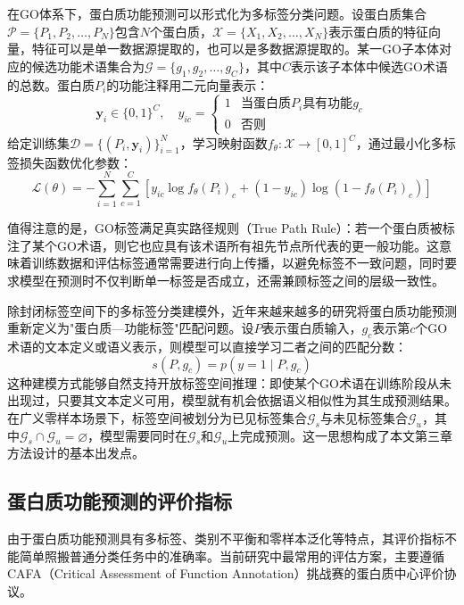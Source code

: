 在GO体系下，蛋白质功能预测可以形式化为多标签分类问题。设蛋白质集合$\mathcal{P}=\{P_1,P_2,\ldots,P_N\}$包含$N$个蛋白质，$\mathcal{X} = \{X_1, X_2, \ldots, X_N\}$表示蛋白质的特征向量，特征可以是单一数据源提取的，也可以是多数据源提取的。某一GO子本体对应的候选功能术语集合为$\mathcal{G} = \{g_1, g_2, \ldots, g_C\}$，其中$C$表示该子本体中候选GO术语的总数。蛋白质$P_i$的功能注释用二元向量表示：
\begin{equation}
\mathbf{y}_i \in \{0,1\}^C, \quad y_{ic} =
\begin{cases}
1 & \text{当蛋白质}P_i\text{具有功能}g_c \\
0 & \text{否则}
\end{cases}
\end{equation}
给定训练集$\mathcal{D} = \{(P_i, \mathbf{y}_i)\}_{i=1}^{N}$，学习映射函数$f_\theta: \mathcal{X} \to [0,1]^C$，通过最小化多标签损失函数优化参数：
\begin{equation}
\mathcal{L}(\theta) = -\sum_{i=1}^{N}\sum_{c=1}^{C}\left[y_{ic}\log f_\theta(P_i)_c + (1-y_{ic})\log(1-f_\theta(P_i)_c)\right]
\end{equation}

值得注意的是，GO标签满足真实路径规则（True Path Rule）：若一个蛋白质被标注了某个GO术语，则它也应具有该术语所有祖先节点所代表的更一般功能。这意味着训练数据和评估标签通常需要进行向上传播，以避免标签不一致问题，同时要求模型在预测时不仅判断单一标签是否成立，还需兼顾标签之间的层级一致性。

除封闭标签空间下的多标签分类建模外，近年来越来越多的研究将蛋白质功能预测重新定义为"蛋白质—功能标签"匹配问题。设$P$表示蛋白质输入，$g_c$表示第$c$个GO术语的文本定义或语义表示，则模型可以直接学习二者之间的匹配分数：
\begin{equation}
s(P, g_c) = p(y=1 \mid P, g_c)
\end{equation}
这种建模方式能够自然支持开放标签空间推理：即使某个GO术语在训练阶段从未出现过，只要其文本定义可用，模型就有机会依据语义相似性为其生成预测结果。在广义零样本场景下，标签空间被划分为已见标签集合$\mathcal{G}_s$与未见标签集合$\mathcal{G}_u$，其中$\mathcal{G}_s \cap \mathcal{G}_u = \varnothing$，模型需要同时在$\mathcal{G}_s$和$\mathcal{G}_u$上完成预测。这一思想构成了本文第三章方法设计的基本出发点。

\subsection{蛋白质功能预测的评价指标}

由于蛋白质功能预测具有多标签、类别不平衡和零样本泛化等特点，其评价指标不能简单照搬普通分类任务中的准确率。当前研究中最常用的评估方案，主要遵循CAFA（Critical Assessment of Function Annotation）挑战赛\cite{zhou2019cafa}的蛋白质中心评价协议。


